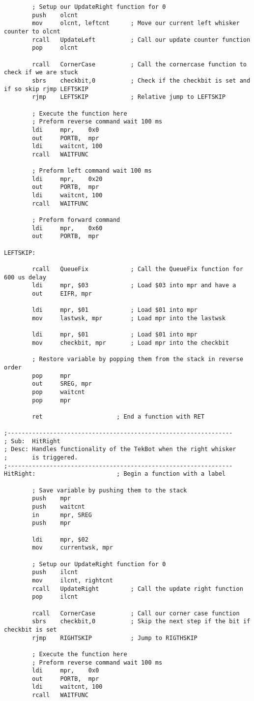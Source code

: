 \documentclass[12pt, letterpaper]{article}
\begin{document}
\begin{verbatim}
		; Setup our UpdateRight function for 0
		push	olcnt
		mov		olcnt, leftcnt		; Move our current left whisker counter to olcnt
		rcall	UpdateLeft			; Call our update counter function
		pop		olcnt

		rcall	CornerCase			; Call the cornercase function to check if we are stuck
		sbrs	checkbit,0			; Check if the checkbit is set and if so skip rjmp LEFTSKIP
		rjmp	LEFTSKIP			; Relative jump to LEFTSKIP

		; Execute the function here
		; Preform reverse command wait 100 ms
		ldi		mpr,	0x0
		out		PORTB,	mpr
		ldi		waitcnt, 100
		rcall	WAITFUNC

		; Preform left command wait 100 ms
		ldi		mpr,	0x20
		out		PORTB,	mpr
		ldi		waitcnt, 100
		rcall	WAITFUNC

		; Preform forward command
		ldi		mpr,	0x60
		out		PORTB,	mpr

LEFTSKIP:

		rcall	QueueFix			; Call the QueueFix function for 600 us delay
		ldi		mpr, $03			; Load $03 into mpr and have a 
		out		EIFR, mpr

		ldi		mpr, $01			; Load $01 into mpr
		mov		lastwsk, mpr		; Load mpr into the lastwsk

		ldi		mpr, $01			; Load $01 into mpr
		mov		checkbit, mpr		; Load mpr into the checkbit

		; Restore variable by popping them from the stack in reverse order
		pop 	mpr
		out 	SREG, mpr
		pop 	waitcnt
		pop 	mpr

		ret						; End a function with RET

;----------------------------------------------------------------
; Sub:	HitRight
; Desc:	Handles functionality of the TekBot when the right whisker
;		is triggered.
;----------------------------------------------------------------
HitRight:						; Begin a function with a label

		; Save variable by pushing them to the stack
		push	mpr	
		push	waitcnt
		in  	mpr, SREG
		push	mpr

		ldi		mpr, $02
		mov		currentwsk, mpr

		; Setup our UpdateRight function for 0
		push	ilcnt
		mov		ilcnt, rightcnt
		rcall	UpdateRight			; Call the update right function 
		pop		ilcnt

		rcall	CornerCase			; Call our corner case function
		sbrs	checkbit,0			; Skip the next step if the bit if checkbit is set
		rjmp	RIGHTSKIP			; Jump to RIGTHSKIP

		; Execute the function here
		; Preform reverse command wait 100 ms
		ldi		mpr,	0x0
		out		PORTB,	mpr
		ldi		waitcnt, 100
		rcall	WAITFUNC


\end{verbatim}
\end{document}
